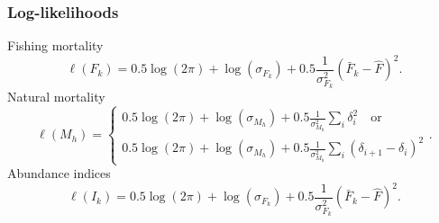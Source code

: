 \documentclass{beamer}
\begin{document}
\begin{frame}
\frametitle{Log-likelihoods}
Fishing mortality
\begin{equation*}
  \ell(F_k) = 0.5 \log (2 \pi) + \log (\sigma_{F_k}) + 0.5
  \frac{1}{\sigma^2_{F_k}} (\bar{F}_k - \hat{F})^2.
\end{equation*}
Natural mortality
\begin{equation*}
  \ell(M_h) = 
  \begin{cases}
    0.5 \log (2 \pi) + \log (\sigma_{M_h}) + 0.5 \frac{1}{\sigma^2_{M_h}} \sum_i
    \delta_i^2 \quad \text{or}\\
    0.5 \log (2 \pi) + \log (\sigma_{M_h}) + 0.5 \frac{1}{\sigma^2_{M_h}} \sum_i
    (\delta_{i+1} - \delta_i)^2
  \end{cases}.
\end{equation*}
Abundance indices
\begin{equation*}
  \ell(I_k) = 0.5 \log (2 \pi) + \log (\sigma_{F_k}) + 0.5
  \frac{1}{\sigma^2_{F_k}} (\bar{F}_k - \hat{F})^2.
\end{equation*}

\end{frame}

\end{document}

